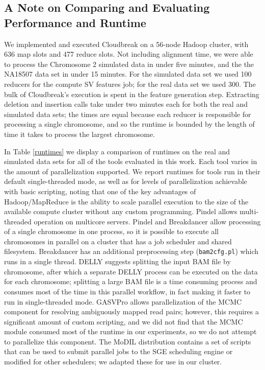 \documentclass [11pt] {report}
\begin{document}
\subsection{A Note on Comparing and Evaluating Performance and Runtime}

We implemented and executed Cloudbreak on a 56-node Hadoop cluster, with 636 map slots and 477 reduce slots. Not including alignment time, we were able to process the Chromosome 2 simulated data in under five minutes, and the the NA18507 data set in under 15 minutes. For the simulated data set we used 100 reducers for the compute SV features job; for the real data set we used 300. The bulk of Cloudbreak's execution is spent in the feature generation step. Extracting deletion and insertion calls take under two minutes each for both the real and simulated data sets; the times are equal because each reducer is responsible for processing a single chromosome, and so the runtime is bounded by the length of time it takes to process the largest chromosome. 

In Table \ref{runtimes} we display a comparison of runtimes on the real and simulated data sets for all of the tools evaluated in this work. Each tool varies in the amount of parallelization supported. We report runtimes for tools run in their default single-threaded mode, as well as for levels of parallelization achievable with basic scripting, noting that one of the key advantages of Hadoop/MapReduce is the ability to scale parallel execution to the size of the available compute cluster without any custom programming. Pindel allows multi-threaded operation on multicore servers. Pindel and Breakdancer allow processing of a single chromosome in one process, so it is possible to execute all chromosomes in parallel on a cluster that has a job scheduler and shared filesystem. Breakdancer has an additional preprocessing step (\texttt{bam2cfg.pl}) which runs in a single thread. DELLY suggests splitting the input BAM file by chromosome, after which a separate DELLY process can be executed on the data for each chromosome; splitting a large BAM file is a time consuming process and consumes most of the time in this parallel workflow, in fact making it faster to run in single-threaded mode. GASVPro allows parallelization of the MCMC component for resolving ambiguously mapped read pairs; however, this requires a significant amount of custom scripting, and we did not find that the MCMC module consumed most of the runtime in our experiments, so we do not attempt to parallelize this component. The MoDIL distribution contains a set of scripts that can be used to submit parallel jobs to the SGE scheduling engine or modified for other schedulers; we adapted these for use in our cluster.
\end{document}
